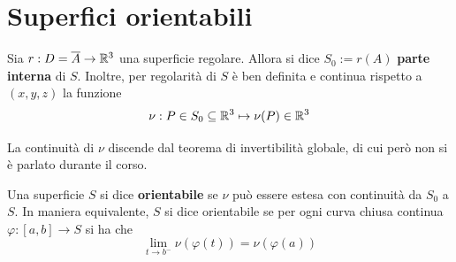 \section{Superfici orientabili}
Sia $r: D=\overline{A} \to \mathbb{R}^3$ una superficie regolare. Allora si dice $S_0:= r(A)$ \textbf{parte interna} di $S$. Inoltre, per regolarità di $S$ è ben definita e continua rispetto a $(x,y,z)$ la funzione
\begin{equation*}
    \nu: P \in S_0 \subseteq \mathbb{R}^3 \mapsto \nu(P) \in \mathbb{R}^3
\end{equation*}
\begin{oss}
    La continuità di $\nu$ discende dal teorema di invertibilità globale, di cui però non si è parlato durante il corso.
\end{oss}
\begin{definition} \label{Def: Superficie orientabile}
Una superficie $S$ si dice \textbf{orientabile} se $\nu$ può essere estesa con continuità da $S_0$ a $S$. In maniera equivalente, $S$ si dice orientabile se per ogni curva chiusa continua $\varphi: [a,b] \to S$ si ha che
\begin{equation*}
    \lim_{t \to b^-}{\nu(\varphi(t))}=\nu(\varphi(a))
\end{equation*}
\end{definition}

